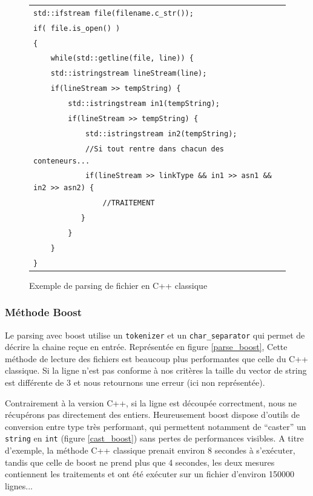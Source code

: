 \begin{figure}[H]
   \begin{center}
      \begin{tabular}{l}
        \hline 
        \verb|std::ifstream file(filename.c_str());|\\
	\verb|if( file.is_open() )|\\
	\verb|{|\\
   	\verb|    while(std::getline(file, line)) {|\\
      	\verb|    std::istringstream lineStream(line);|\\
      	\verb|    if(lineStream >> tempString) {|\\
        \verb|        std::istringstream in1(tempString);|\\
        \verb|        if(lineStream >> tempString) {|\\
        \verb|            std::istringstream in2(tempString);|\\
        \verb|            //Si tout rentre dans chacun des conteneurs...|\\
        \verb|            if(lineStream >> linkType && in1 >> asn1 && in2 >> asn2) {|\\
        \verb|                //TRAITEMENT|\\
        \verb|           }|\\
        \verb|        }|\\
        \verb|    }|\\
        \verb|}|\\
        \hline
      \end{tabular}
   \end{center}
\caption{\label{parse_cpp} Exemple de parsing de fichier en C++ classique}
\end{figure}




\subsubsection{Méthode Boost}
Le parsing avec boost utilise un \verb|tokenizer| et un \verb|char_separator| qui permet de décrire la chaine re\c cue en entrée. Représentée en figure \ref{parse_boost}, Cette méthode de lecture des fichiers est beaucoup plus performantes que celle du C++ classique. Si la ligne n'est pas conforme à nos critères la taille du vector de string est différente de 3 et nous retournons une erreur (ici non représentée). 

Contrairement à la version C++, si la ligne est découpée correctment, nous ne récupérons pas directement des entiers. Heureusement boost dispose d'outils de conversion entre type très performant, qui permettent notamment de ``caster'' un \verb|string| en \verb|int| (figure \ref{cast_boost}) sans pertes de performances visibles. A titre d'exemple, la méthode C++ classique prenait environ 8 secondes à s'exécuter, tandis que celle de boost ne prend plus que 4 secondes, les deux mesures contiennent les traitements et ont été exécuter sur un fichier d'environ 150000 lignes...

